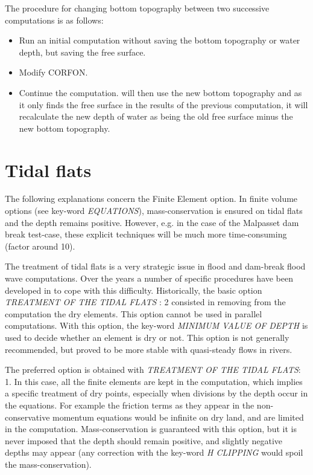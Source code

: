 The procedure for changing bottom topography between two successive computations is as follows:
\begin{itemize}
\item Run an initial computation without saving the bottom topography or water depth, but saving the free surface.

\item Modify CORFON.

\item Continue the computation.  will then use the new bottom topography and as it only finds the free surface in the results of the previous computation, it will recalculate the new depth of water as being the old free surface minus the new bottom topography.

\end{itemize}


\section{  Tidal flats}

 The following explanations concern the Finite Element option. In finite volume options (see key-word \textit{EQUATIONS}), mass-conservation is ensured on tidal flats and the depth remains positive. However, e.g. in the case of the Malpasset dam break test-case, these explicit techniques will be much more time-consuming (factor around 10).

 The treatment of tidal flats is a very strategic issue in flood and dam-break flood wave computations. Over the years a number of specific procedures have been developed in  to cope with this difficulty. Historically, the basic option \textit{TREATMENT OF THE TIDAL FLATS} : 2 consisted in removing from the computation the dry elements. This option cannot be used in parallel computations. With this option, the key-word \textit{MINIMUM VALUE OF DEPTH} is used to decide whether an element is dry or not. This option is not generally recommended, but proved to be more stable with quasi-steady flows in rivers.

 The preferred option is obtained with \textit{TREATMENT OF THE TIDAL FLATS}: 1. In this case, all the finite elements are kept in the computation, which implies a specific treatment of dry points, especially when divisions by the depth occur in the equations. For example the friction terms as they appear in the non-conservative momentum equations would be infinite on dry land, and are limited in the computation. Mass-conservation is guaranteed with this option, but it is never imposed that the depth should remain positive, and slightly negative depths may appear (any correction with the key-word \textit{H CLIPPING} would spoil the mass-conservation).

